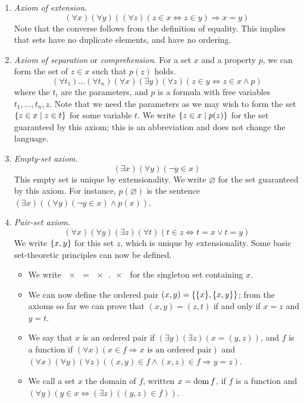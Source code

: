 \begin{enumerate}
    \item \emph{Axiom of extension}.
    \[ (\forall x)(\forall y)((\forall z)(z \in x \Leftrightarrow z \in y) \Rightarrow x = y) \]
    Note that the converse follows from the definition of equality.
    This implies that sets have no duplicate elements, and have no ordering.
    \item \emph{Axiom of separation} or \emph{comprehension}.
    For a set \( x \) and a property \( p \), we can form the set of \( z \in x \) such that \( p(z) \) holds.
    \[ (\forall t_1)\dots(\forall t_n)(\forall x)(\exists y)(\forall z)(z \in y \Leftrightarrow z \in x \wedge p) \]
    where the \( t_i \) are the parameters, and \( p \) is a formula with free variables \( t_1, \dots, t_n, z \).
    Note that we need the parameters as we may wish to form the set \( \qty{z \in x \mid z \in t} \) for some variable \( t \).
    We write \( \qty{z \in x \mid p(z)} \) for the set guaranteed by this axiom; this is an abbreviation and does not change the language.
    \item \emph{Empty-set axiom}.
    \[ (\exists x)(\forall y)(\neg y \in x) \]
    This empty set is unique by extensionality.
    We write \( \varnothing \) for the set guaranteed by this axiom.
    For instance, \( p(\varnothing) \) is the sentence \( (\exists x)((\forall y)(\neg y \in x) \wedge p(x)) \).
    \item \emph{Pair-set axiom}.
    \[ (\forall x)(\forall y)(\exists z)(\forall t)(t \in z \Leftrightarrow t = x \vee t = y) \]
    We write \( \qty{x, y} \) for this set \( z \), which is unique by extensionality.
    Some basic set-theoretic principles can now be defined.
    \begin{itemize}
        \item We write \( \qty{x} = \qty{x, x} \) for the singleton set containing \( x \).
        \item We can now define the ordered pair \( (x, y) = \qty{\qty{x}, \qty{x, y}} \); from the axioms so far we can prove that \( (x, y) = (z, t) \) if and only if \( x = z \) and \( y = t \).
        \item We say that \( x \) is an ordered pair if \( (\exists y)(\exists z)(x = (y,z)) \), and \( f \) is a function if \( (\forall x)(x \in f \Rightarrow x \text{ is an ordered pair}) \) and \( (\forall x)(\forall y)(\forall z)((x,y) \in f \wedge (x,z) \in f \Rightarrow y = z) \).
        \item We call a set \( x \) the domain of \( f \), written \( x = \operatorname{dom} f \), if \( f \) is a function and \( (\forall y)(y \in x \Leftrightarrow (\exists z)((y,z) \in f)) \).

\end{itemize}
\end{enumerate}
